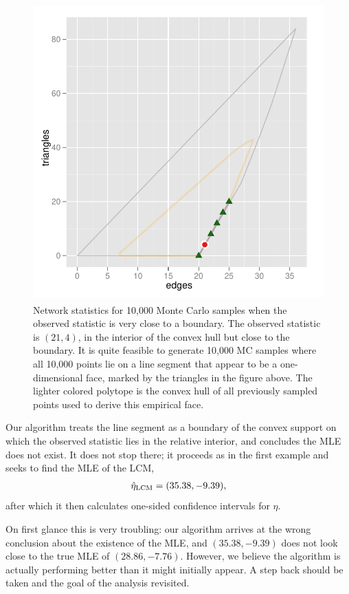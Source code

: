 \begin{figure}[!h]
\centering
\includegraphics[height=4.5in,width=4.5in]{Figures/MCsample-fakeface}
\caption[Network statistics for 10,000 Monte Carlo samples when the observed 
statistic is very close to a boundary]
{Network statistics for 10,000 Monte Carlo samples when the observed 
statistic is very close to a boundary.  The observed statistic is $(21,4)$, 
in the interior of the convex hull but 
close to the boundary.  It is quite feasible to generate 10,000 MC 
samples where all 10,000 points lie on a line segment that appear to be 
a one-dimensional face, marked by the triangles in the figure above.  
The lighter colored polytope is the convex hull of all previously 
sampled points used to derive this empirical face.}
\label{F:MC problem}
\end{figure}

Our algorithm treats the line segment as a boundary of the 
convex support on which the observed statistic lies in the relative interior, and 
concludes the MLE does not exist.  It does not stop there; it proceeds as in the first
example and seeks to find the MLE of the LCM,
\begin{align*}
	\hat{\eta}_{\textrm{LCM}} = (35.38, -9.39),
\end{align*}
after which it then calculates one-sided confidence intervals for $\eta$.

On first glance this is very troubling: our algorithm arrives at the wrong conclusion 
about the existence of the MLE, and $(35.38, -9.39)$ does not look close 
to the true MLE of $(28.86, -7.76)$.  However, we believe the algorithm is
actually performing better than it might initially appear.
A step back should be taken and the goal of the analysis revisited.  

